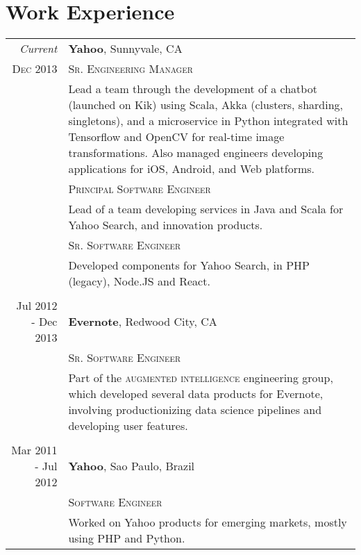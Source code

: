\documentclass[a4paper,10pt]{article}
\begin{document}
\section{Work Experience}
\begin{tabular}{r|p{14cm}}
 \emph{Current} & \textbf{Yahoo}\footnotemark,
 							    Sunnyvale, CA \\ \textsc{Dec 2013}
 &\textsc{Sr. Engineering Manager}\\&

 Lead a team through the development of a chatbot (launched on Kik) using Scala,
 Akka (clusters, sharding, singletons), and a microservice in Python integrated
 with Tensorflow and OpenCV for real-time image transformations. Also managed
 engineers developing applications for iOS, Android, and Web platforms.

 \\
 &\textsc{Principal Software Engineer}\\&

 Lead of a team developing services in Java and Scala for Yahoo Search,
 and innovation products.

 \\
 &\textsc{Sr. Software Engineer}\\&

 Developed components for Yahoo Search, in PHP (legacy), Node.JS and React.

 \\

 \multicolumn{2}{c}{} \\

 Jul 2012 - Dec 2013 & \textbf{Evernote}, Redwood City, CA \\
 &\textsc{Sr. Software Engineer}\\&

 Part of the \textsc{augmented intelligence} engineering group, which developed
 several data products for Evernote, involving productionizing data science
 pipelines and developing user features.

 \\
 \multicolumn{2}{c}{} \\

 Mar 2011 - Jul 2012 & \textbf{Yahoo}\footnotemark[1], Sao Paulo, Brazil \\
 &\textsc{Software Engineer}\\&

 Worked on Yahoo products for emerging markets, mostly using PHP and Python.

\end{tabular}
\end{document}
